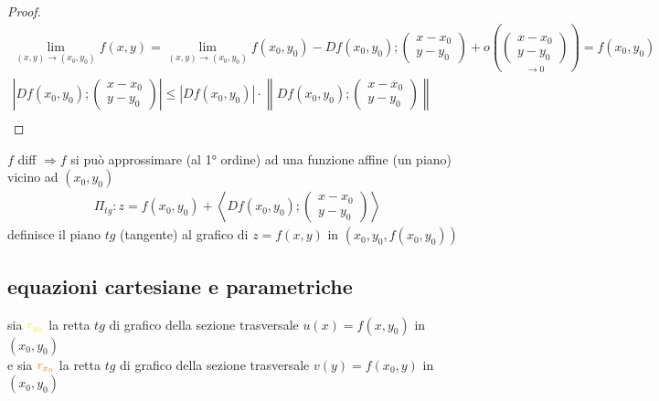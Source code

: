 \documentclass[a4paper, oneside]{article}
\begin{document}
        \begin{proof}
            \begin{gather*}
                \lim_{(x,y) \to (x_0,y_0)} f(x,y) = \lim_{(x,y) \to (x_0,y_0)} f(x_0,y_0) - Df(x_0,y_0);\begin{pmatrix} x-x_0 \\ y-y_0 \end{pmatrix}  + o\left(\underset{\to 0}{\begin{pmatrix} x-x_0 \\ y-y_0 \end{pmatrix}} \right) = f(x_0,y_0)\\
                \left\lvert Df(x_0,y_0);\begin{pmatrix} x-x_0 \\ y-y_0 \end{pmatrix}\right\rvert  \leq \left\lvert Df(x_0,y_0)\right\rvert  \cdot  \left\lVert Df(x_0,y_0);\begin{pmatrix} x-x_0 \\ y-y_0 \end{pmatrix}\right\rVert  \\
            \end{gather*}
        \end{proof}
        \begin{observation}
            $f$ diff $\Rightarrow f$ si può approssimare (al 1° ordine) ad una funzione affine (un piano) vicino ad $(x_0,y_0)$\\
            \begin{gather*}
                \Pi_{tg}: z= f(x_0,y_0) + \left\langle Df(x_0,y_0);\begin{pmatrix} x-x_0 \\ y-y_0 \end{pmatrix}\right\rangle 
            \end{gather*}
            definisce il piano $tg$ (tangente) al grafico di $z= f(x,y) $ in $ (x_0,y_0, f(x_0,y_0))$\\
        \end{observation}
        \subsection{equazioni cartesiane e parametriche}
        sia $\textcolor{yellow}{r_{y_0}}$ la retta $tg$ di grafico della sezione trasversale $u(x) = f(x,y_0)$ in $ (x_0,y_0)$\\
        e sia $\textcolor{orange}{r_{x_0}}$ la retta $tg$ di grafico della sezione trasversale $v(y) = f(x_0,y)$ in $ (x_0,y_0)$\\  
        
\end{document}
